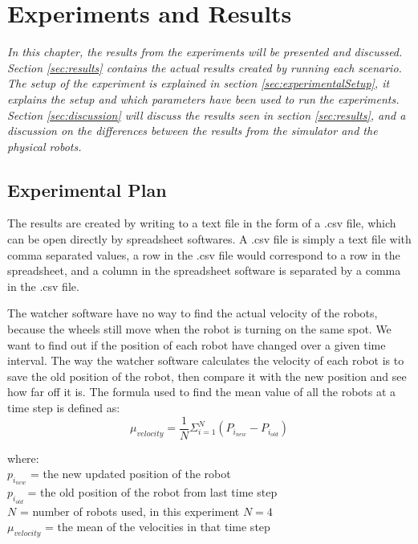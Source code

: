 \chapter{Experiments and Results}
\label{cha:ResearchAndResults}

{\it In this chapter, the results from the experiments will be presented and discussed. Section \ref{sec:results} contains the actual results created by running each scenario. The setup of the experiment is explained in section \ref{sec:experimentalSetup}, it explains the setup and which parameters have been used to run the experiments.
Section \ref{sec:discussion} will discuss the results seen in section \ref{sec:results}, and a discussion on the differences between the results from the simulator and the physical robots.}

\section{Experimental Plan}
\label{sec:experimentalPlan}

The results are created by writing to a text file in the form of a .csv file, which can be open directly by spreadsheet softwares. A .csv file is simply a text file with comma separated values, a row in the .csv file would correspond to a row in the spreadsheet, and a column in the spreadsheet software is separated by a comma in the .csv file.

The watcher software have no way to find the actual velocity of the robots, because the wheels still move when the robot is turning on the same spot. We want to find out if the position of each robot have changed over a given time interval.
The way the watcher software calculates the velocity of each robot is to save the old position of the robot, then compare it with the new position and see how far off it is.
The formula used to find the mean value of all the robots at a time step is defined as:
\begin{equation}
\label{eq:muvel}
\mu_{velocity} = \frac{1}{N} \Sigma_{i=1}^N (P_{i_{new}} - P_{i_{old}})
\end{equation}

where:
\\
$p_{i_{new}}$ = the new updated position of the robot
\\
$p_{i_{old}}$ = the old position of the robot from last time step
\\
$N$ = number of robots used, in this experiment $N = 4$ 
\\
$\mu_{velocity}$ = the mean of the velocities in that time step

